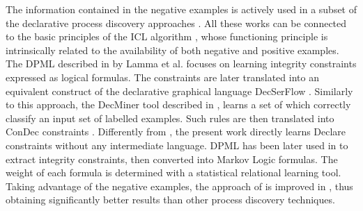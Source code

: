 The information contained in the negative examples is actively used in a subset of the declarative process discovery approaches \cite{2007-Lamma,2009-Chesani,2010-Bellodi,2016-Bellodi,slaats_weighing_2021}. All these works can be connected to the basic principles of the \ac{ICL} algorithm \cite{1995-DaRaedt}, whose functioning principle is intrinsically related to the availability of both negative and positive examples. 
The \ac{DPML} described in \cite{2007-Lamma, 2007b-Lamma} by Lamma et al. focuses on learning integrity constraints expressed as logical formulas. The constraints are later translated into an equivalent construct of the declarative graphical language DecSerFlow \cite{2006-Aalst}. Similarly to this approach, the DecMiner tool described in \cite{2009-Chesani}, learns a set of  \cite{2008-Alberti} which correctly classify an input set of labelled examples. Such rules are then translated into ConDec constraints \cite{2006-Pesic}. Differently from \cite{2009-Chesani}, the present work directly learns Declare constraints without any intermediate language.
\ac{DPML} has been later used in \cite{2010-Bellodi} to extract integrity constraints, then converted into Markov Logic formulas. The weight of each formula is determined with a statistical relational learning tool. %
Taking advantage of the negative examples, the approach of \cite{2010-Bellodi}  is improved in \cite{2016-Bellodi}, thus obtaining significantly better results than other process discovery techniques. 
%
